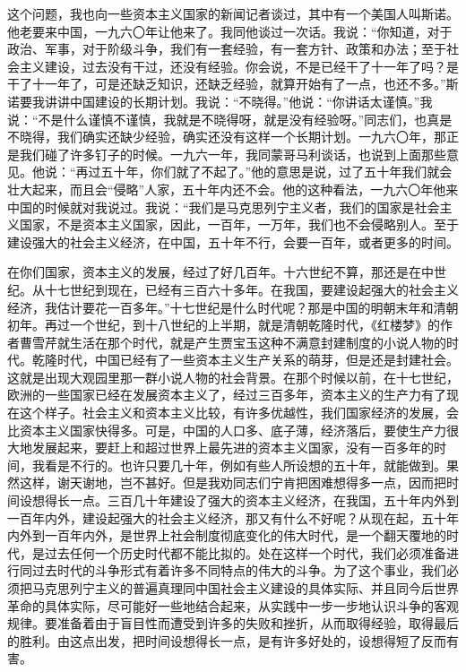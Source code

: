 这个问题，我也向一些资本主义国家的新闻记者谈过，其中有一个美国人叫斯诺。他老要来中国，一九六〇年让他来了。我同他谈过一次话。我说：“你知道，对于政治、军事，对于阶级斗争，我们有一套经验，有一套方针、政策和办法；至于社会主义建设，过去没有干过，还没有经验。你会说，不是已经干了十一年了吗？是干了十一年了，可是还缺乏知识，还缺乏经验，就算开始有了一点，也还不多。”斯诺要我讲讲中国建设的长期计划。我说：“不晓得。”他说：“你讲话太谨慎。”我说：“不是什么谨慎不谨慎，我就是不晓得呀，就是没有经验呀。”同志们，也真是不晓得，我们确实还缺少经验，确实还没有这样一个长期计划。一九六〇年，那正是我们碰了许多钉子的时候。一九六一年，我同蒙哥马利谈话，也说到上面那些意见。他说：“再过五十年，你们就了不起了。”他的意思是说，过了五十年我们就会壮大起来，而且会“侵略”人家，五十年内还不会。他的这种看法，一九六〇年他来中国的时候就对我说过。我说：“我们是马克思列宁主义者，我们的国家是社会主义国家，不是资本主义国家，因此，一百年，一万年，我们也不会侵略别人。至于建设强大的社会主义经济，在中国，五十年不行，会要一百年，或者更多的时间。

在你们国家，资本主义的发展，经过了好几百年。十六世纪不算，那还是在中世纪。从十七世纪到现在，已经有三百六十多年。在我国，要建设起强大的社会主义经济，我估计要花一百多年。”十七世纪是什么时代呢？那是中国的明朝末年和清朝初年。再过一个世纪，到十八世纪的上半期，就是清朝乾隆时代，《红楼梦》的作者曹雪芹就生活在那个时代，就是产生贾宝玉这种不满意封建制度的小说人物的时代。乾隆时代，中国已经有了一些资本主义生产关系的萌芽，但是还是封建社会。这就是出现大观园里那一群小说人物的社会背景。在那个时候以前，在十七世纪，欧洲的一些国家已经在发展资本主义了，经过三百多年，资本主义的生产力有了现在这个样子。社会主义和资本主义比较，有许多优越性，我们国家经济的发展，会比资本主义国家快得多。可是，中国的人口多、底子薄，经济落后，要使生产力很大地发展起来，要赶上和超过世界上最先进的资本主义国家，没有一百多年的时间，我看是不行的。也许只要几十年，例如有些人所设想的五十年，就能做到。果然这样，谢天谢地，岂不甚好。但是我劝同志们宁肯把困难想得多一点，因而把时间设想得长一点。三百几十年建设了强大的资本主义经济，在我国，五十年内外到一百年内外，建设起强大的社会主义经济，那又有什么不好呢？从现在起，五十年内外到一百年内外，是世界上社会制度彻底变化的伟大时代，是一个翻天覆地的时代，是过去任何一个历史时代都不能比拟的。处在这样一个时代，我们必须准备进行同过去时代的斗争形式有着许多不同特点的伟大的斗争。为了这个事业，我们必须把马克思列宁主义的普遍真理同中国社会主义建设的具体实际、并且同今后世界革命的具体实际，尽可能好一些地结合起来，从实践中一步一步地认识斗争的客观规律。要准备着由于盲目性而遭受到许多的失败和挫折，从而取得经验，取得最后的胜利。由这点出发，把时间设想得长一点，是有许多好处的，设想得短了反而有害。


